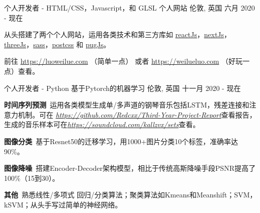 

\begin{cventries}

  \cventry
    {个人开发者 - HTML/CSS，Javascript，和 GLSL} %
    {个人网站} %
    {伦敦, 英国} %
    {六月 2020 - 现在} %
    {
      \begin{cvitems} %
        \item {从头搭建了两个个人网站，运用各类技术和第三方库如 \href{https://reactjs.org/}{reactJs}，\href{https://nextjs.org/}{nextJs}，\href{https://threejs.org/}{threeJs}，\href{https://sass-lang.com/}{sass}，\href{https://postcss.org/}{postcss} 和 \href{https://pugjs.org/api/getting-started.html}{pugJs}。}
        \item 前往 \url{https://luoweilue.com} （简单一点） 或者 \url{https://weilueluo.com} （好玩一点）查看。
      \end{cvitems}
    }
    
  \cventry
    {个人开发者 - Python} %
    {基于Pytorch的机器学习} %
    {伦敦, 英国} %
    {十一月 2020 - 现在} %
    {
      \begin{cvitems} %
      \item {\textbf{时间序列预测}\, 运用各类模型生成单/多声道的钢琴音乐包括LSTM，残差连接和注意力机制。可在 \href{https://github.com/Redcxx/Third-Year-Project-Report}{\textit{https://github.com/Redcxx/Third-Year-Project-Report}}查看报告，生成的音乐样本可在\href{https://soundcloud.com/kallzvx/sets}{\textit{https://soundcloud.com/kallzvx/sets}}查看。}
      \item {\textbf{图像分类}\, 基于Resnet50的迁移学习，用1000+图片分类10个标签，准确率达90\%。}
      \item {\textbf{图像降噪}\, 搭建Encoder-Decoder架构模型，相比于传统高斯降噪手段PSNR提高了100\%（15到30）。}
      \item {\textbf{其他}\, 熟悉线性/多项式 回归/分类算法；聚类算法如Kmeans和Meanshift；SVM，kSVM；从头手写过简单的神经网络。}
      \end{cvitems}
    }
    

\end{cventries}
